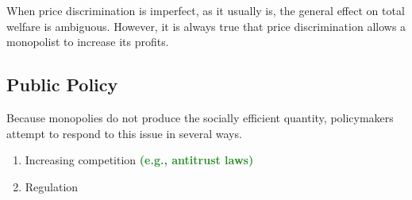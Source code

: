 \documentclass[11pt]{article}\usepackage[]{graphicx}\usepackage[]{color}
\theoremstyle{definition}
\newcommand{\ddp}[1]{{\textbf{\textcolor{ForestGreen}{#1}}}}
\begin{document}
	When price discrimination is imperfect, as it usually is, the general effect on total welfare is ambiguous. However, it is always true that price discrimination allows a monopolist to increase its profits.
	
	
	
	\subsection{Public Policy}
	
	Because monopolies do not produce the socially efficient quantity, policymakers attempt to respond to this issue in several ways.  
	
	\begin{enumerate}
		\item Increasing competition \ddp{(e.g., antitrust laws)}
		\item Regulation 
		

\end{enumerate}
\end{document}
